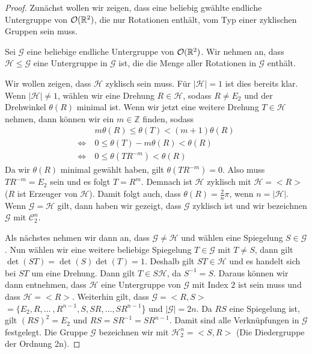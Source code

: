 \begin{proof}
	 Zunächst wollen wir zeigen, dass eine beliebig gwählte endliche Untergruppe von ${\mathcal{O}(\mathbb{R}^2)}$, die nur Rotationen enthält, vom Typ einer zyklischen Gruppen sein muss. \par\smallskip  
	 Sei $\mathcal{G}$ eine beliebige endliche Untergruppe von ${\mathcal{O}(\mathbb{R}^2)}$. Wir nehmen an, dass $\mathcal{H} \leq \mathcal{G}$ eine Untergruppe in $\mathcal{G}$ ist, die die Menge aller Rotationen in $\mathcal{G}$ enthält. 
	 
	 Wir wollen zeigen, dass $\mathcal{H}$ zyklisch sein muss. Für $|\mathcal{H}|=1$ ist dies bereits klar. Wenn $|\mathcal{H}| \neq 1$, wählen wir eine Drehung $R \in \mathcal{H}$, sodass $R \neq E_2$ und der Drehwinkel $\theta(R)$ minimal ist. Wenn wir jetzt eine weitere Drehung $T \in \mathcal{H}$ nehmen, dann können wir ein $m \in \mathbb{Z}$ finden, sodass \begin{align*}
	 &m \theta(R)\leq\theta(T)<(m+1)\theta(R) \\
	 \Leftrightarrow \ &0 \leq \theta(T)-m\theta(R)<\theta(R) \\
	 \Leftrightarrow \ &0 \leq \theta(TR^{-m})<\theta(R)
\end{align*}
	 Da wir $\theta(R)$ minimal gewählt haben, gilt $\theta(TR^{-m})=0$. Also muss $TR^{-m}=E_2$ sein und es folgt $T=R^{m}$. Demnach ist $\mathcal{H}$ zyklisch mit $\mathcal{H}=<R>$ ($R$ ist Erzeuger von $\mathcal{H}$). Damit folgt auch, dass $\theta(R)=\frac{2}{n}\pi$, wenn $n=|\mathcal{H}|$. Wenn $\mathcal{G} = \mathcal{H}$ gilt, dann haben wir gezeigt, dass $\mathcal{G}$ zyklisch ist und wir bezeichnen $\mathcal{G}$ mit $\mathcal{C}^n_2$.
	 
	 Als nächstes nehmen wir dann an, dass $\mathcal{G} \neq \mathcal{H}$ und wählen eine Spiegelung $S \in \mathcal{G}$. Nun wählen wir eine weitere beliebige Spiegelung $T \in \mathcal{G}$ mit $T \neq S$, dann gilt $\det(ST)=\det(S)\det(T)=1$. Deshalb gilt $ST \in \mathcal{H}$ und es handelt sich bei $ST$ um eine Drehung. Dann gilt $T \in S\mathcal{H}$, da $S^{-1}=S$. Daraus können wir dann entnehmen, dass $\mathcal{H}$ eine Untergruppe von $\mathcal{G}$ mit Index $2$ ist sein muss und dass $\mathcal{H}=<R>$. Weiterhin gilt, dass $\mathcal{G}=<R,S>$ $=\{E_2,R,\dots \ ,R^{n-1},S,SR,\dots ,SR^{n-1}$\} und $|\mathcal{G}|=2n$. Da $RS$ eine Spiegelung ist, gilt $(RS)^2=E_2$ und $RS=SR^{-1}=SR^{n-1}$. Damit sind alle Verknüpfungen in $\mathcal{G}$ festgelegt. Die Gruppe $\mathcal{G}$ bezeichnen wir mit $\mathcal{H}^n_2=<S,R>$ (Die Diedergruppe der Ordnung 2n).
\end{proof}
